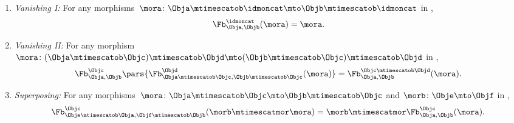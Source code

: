 \begin{ctdefinition}
\begin{enumerate}
        \item \emph{Vanishing I:}
              For any morphisms~$\mora \colon \Obja \mtimescatob \idmoncat \mto \Objb \mtimescatob \idmoncat$ in \CatC,
              \begin{equation}
                  \label{eq:feedback-vanishing_1}
                  \Fb_{\Obja,\Objb}^\idmoncat (\mora)=  \mora.
              \end{equation}
        \item \emph{Vanishing II:}
              For any morphism~$\mora \colon (\Obja\mtimescatob \Objc) \mtimescatob \Objd \mto (\Objb\mtimescatob \Objc) \mtimescatob \Objd$ in \CatC,
              \begin{equation}
                  \label{eq:feedback-vanishing_2}
                  \Fb_{\Obja,\Objb}^\Objc\pars{
                      \Fb_{\Obja \mtimescatob \Objc, \Objb \mtimescatob \Objc}^\Objd(\mora)} = \Fb_{\Obja,\Objb}^{\Objc\mtimescatob \Objd}( \mora).
              \end{equation}
        \item \emph{Superposing:}
              For any morphisms~$\mora\colon \Obja\mtimescatob \Objc \mto \Objb\mtimescatob \Objc$ and $\morb \colon \Obje \mto \Objf$ in \CatC,
              \begin{equation}
                  \label{eq:feedback-superposing}
                  \Fb_{\Obje\mtimescatob \Obja,\Objf\mtimescatob \Objb}^{\Objc}( \morb\mtimescatmor \mora  )=\morb\mtimescatmor \Fb_{\Obja,\Objb}^\Objc(\mora).
              \end{equation}
    \end{enumerate}
\end{ctdefinition}


